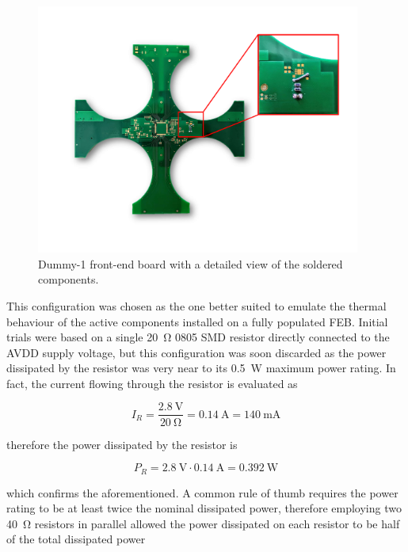 \begin{figure}[h!]
    \centering
    \includegraphics[width=0.95\textwidth]{Images/chap2/dummy_image.pdf}
    \caption{Dummy-1 front-end board with a detailed view of the soldered components.}
    \label{figDummySoldering}
\end{figure}

This configuration was chosen as the one better suited to emulate the thermal behaviour of the active components installed on a fully populated FEB. Initial trials were based on a single \SI{20}{\ohm} 0805 SMD resistor directly connected to the AVDD supply voltage, but this configuration was soon discarded as the power dissipated by the resistor was very near to its \SI{0.5}{\watt} maximum power rating. In fact, the current flowing through the resistor is evaluated as

\begin{equation}
    I_{R} = \frac{\SI{2.8}{\volt}}{\SI{20}{\ohm}} = \SI{0.14}{\ampere} = \SI{140}{\milli\ampere} 
\end{equation}

\noindent
therefore the power dissipated by the resistor is

\begin{equation}
    P_{R} = \SI{2.8}{\volt} \cdot \SI{0.14}{\ampere} = \SI{0.392}{\watt} 
\end{equation}

\noindent
which confirms the aforementioned. A common rule of thumb requires the power rating to be at least twice the nominal dissipated power, therefore employing two \SI{40}{\ohm} resistors in parallel allowed the power dissipated on each resistor to be half of the total dissipated power

